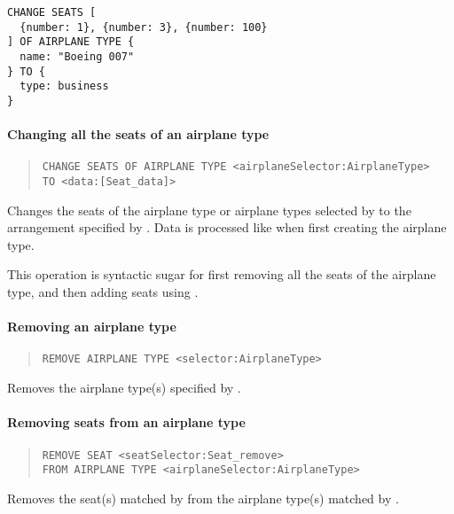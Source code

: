 \begin{texa}
  {
  \begin{lstlisting}
CHANGE SEATS [
  {number: 1}, {number: 3}, {number: 100}
] OF AIRPLANE TYPE {
  name: "Boeing 007"
} TO {
  type: business
}
  \end{lstlisting}
  }
\end{texa}

\paragraph{Changing all the seats of an airplane type}
\begin{quote}
  \begin{lstlisting}
CHANGE SEATS OF AIRPLANE TYPE <airplaneSelector:AirplaneType>
TO <data:[Seat_data]>
  \end{lstlisting}
\end{quote}
Changes the seats of the airplane type or airplane types selected by
 to the arrangement specified by . Data is
processed like when first creating the airplane type.

This operation is syntactic sugar for first removing all the seats of the
airplane type, and then adding seats using .

\paragraph{Removing an airplane type}
\begin{quote}
  \lstinline|REMOVE AIRPLANE TYPE <selector:AirplaneType>|
\end{quote}
Removes the airplane type(s) specified by . 

\paragraph{Removing seats from an airplane type}
\begin{quote}
  \begin{lstlisting}
REMOVE SEAT <seatSelector:Seat_remove>
FROM AIRPLANE TYPE <airplaneSelector:AirplaneType>
  \end{lstlisting}
\end{quote}
Removes the seat(s) matched by  from the airplane type(s)
matched by .

